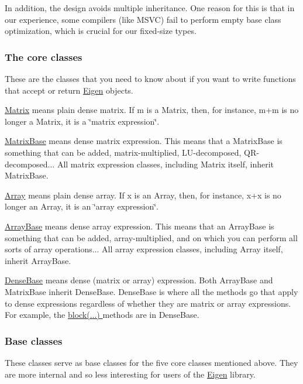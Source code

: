In addition, the design avoids multiple inheritance. One reason for this is that in our experience, some compilers (like M\+S\+VC) fail to perform empty base class optimization, which is crucial for our fixed-\/size types.\hypertarget{_topic_class_hierarchy_TopicClassHierarchyCoreClasses}{}\subsubsection{The core classes}\label{_topic_class_hierarchy_TopicClassHierarchyCoreClasses}
These are the classes that you need to know about if you want to write functions that accept or return \hyperlink{namespace_eigen}{Eigen} objects.


\begin{DoxyItemize}
\item \hyperlink{group___core___module_class_eigen_1_1_matrix}{Matrix} means plain dense matrix. If {\ttfamily m} is a {\ttfamily Matrix}, then, for instance, {\ttfamily m+m} is no longer a {\ttfamily Matrix}, it is a \char`\"{}matrix expression\char`\"{}.
\item \hyperlink{group___core___module_class_eigen_1_1_matrix_base}{Matrix\+Base} means dense matrix expression. This means that a {\ttfamily Matrix\+Base} is something that can be added, matrix-\/multiplied, L\+U-\/decomposed, Q\+R-\/decomposed... All matrix expression classes, including {\ttfamily Matrix} itself, inherit {\ttfamily Matrix\+Base}.
\item \hyperlink{group___core___module_class_eigen_1_1_array}{Array} means plain dense array. If {\ttfamily x} is an {\ttfamily Array}, then, for instance, {\ttfamily x+x} is no longer an {\ttfamily Array}, it is an \char`\"{}array expression\char`\"{}.
\item \hyperlink{group___core___module_class_eigen_1_1_array_base}{Array\+Base} means dense array expression. This means that an {\ttfamily Array\+Base} is something that can be added, array-\/multiplied, and on which you can perform all sorts of array operations... All array expression classes, including {\ttfamily Array} itself, inherit {\ttfamily Array\+Base}.
\item \hyperlink{group___core___module_class_eigen_1_1_dense_base}{Dense\+Base} means dense (matrix or array) expression. Both {\ttfamily Array\+Base} and {\ttfamily Matrix\+Base} inherit {\ttfamily Dense\+Base}. {\ttfamily Dense\+Base} is where all the methods go that apply to dense expressions regardless of whether they are matrix or array expressions. For example, the \hyperlink{group___core___module_ab8e42e67c5cfd5fa13e684642f0f65bf}{block(...) } methods are in {\ttfamily Dense\+Base}.
\end{DoxyItemize}\hypertarget{_topic_class_hierarchy_TopicClassHierarchyBaseClasses}{}\subsubsection{Base classes}\label{_topic_class_hierarchy_TopicClassHierarchyBaseClasses}
These classes serve as base classes for the five core classes mentioned above. They are more internal and so less interesting for users of the \hyperlink{namespace_eigen}{Eigen} library.


